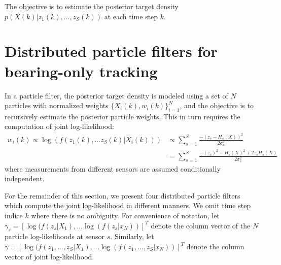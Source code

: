 \documentclass[10pt,letterpaper,final]{article}
\begin{document}
The objective is to estimate the posterior target density $p(X(k)|z_1(k),...,z_S(k))$ at each time step $k$. 


\section{Distributed particle filters for bearing-only tracking}
\label{sec:pf}
In a particle filter, the posterior target density is modeled using a set of $N$ particles with normalized weights $\{X_i(k), w_i(k)\}_{i=1}^N$, and the objective is to recursively estimate the posterior particle weights. This in turn requires the computation of joint log-likelihood:
\begin{align}
w_i(k) \propto \log(f(z_1(k),...z_S(k)|X_i(k))) &\propto \sum_{s=1}^S \frac{-(z_s-H_s(X))^2}{2\sigma_s^2} \nonumber \\ 
&= \sum_{s=1}^S \frac{-(z_s)^2-H_s(X)^2+2z_sH_s(X)}{2\sigma_s^2} \label{eqn:log_lh_normal}
\end{align}
where measurements from different sensors are assumed conditionally independent. 

For the remainder of this section, we present four distributed particle filters which compute the joint log-likelihood in different manners. We omit time step indice $k$ where there is no ambiguity. For convenience of notation, let $\gamma_s = [\log (f(z_s|X_1), ... \log (f(z_s|x_N))]^T$ denote the column vector of the $N$ particle log-likelihoods at sensor $s$. Similarly, let $\gamma = [\log (f(z_1, ..., z_S|X_1), ... \log (f(z_1, ..., z_S|x_N))]^T$ denote the column vector of joint log-likelihood. 
\end{document}
